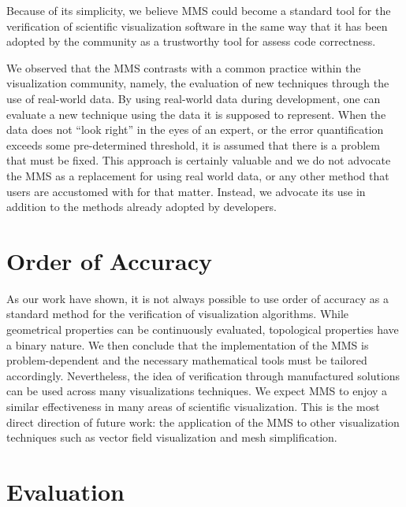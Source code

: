 %
%
Because of its simplicity, we believe MMS could become a standard tool for the verification of scientific visualization software in the same way that it has been adopted by the \cse{} community as a trustworthy tool for assess code correctness.


We observed that the MMS contrasts with a common practice within the visualization community, namely, the evaluation of new techniques through the use of real-world data.  
%
By using real-world data during development, one can evaluate a new technique using the data it is supposed to represent. 
%
When the data does not ``look right'' in the eyes of an expert, or the error quantification exceeds some pre-determined threshold, it is assumed that there is a problem that must be fixed.
%
This approach is certainly valuable and we do not advocate the MMS as a replacement for using real world data, or any other method that users are accustomed with for that matter. 
%
Instead, we advocate its use in addition to the methods already adopted by developers.

\section{Order of Accuracy}

As our work have shown, it is not always possible to use order of accuracy as a standard method for the verification of visualization algorithms. 
%
While geometrical properties can be continuously evaluated, topological properties have a binary nature.
%
We then conclude that the implementation of the MMS is problem-dependent and the necessary mathematical tools must be tailored accordingly. 
%
Nevertheless, the idea of verification through manufactured solutions can be used across many visualizations techniques. 
%
We expect MMS to enjoy a similar effectiveness in many areas of scientific visualization.
%
This is the most direct direction of future work: the application of the MMS to other visualization techniques such as vector field visualization and mesh simplification.


\section{Evaluation}

